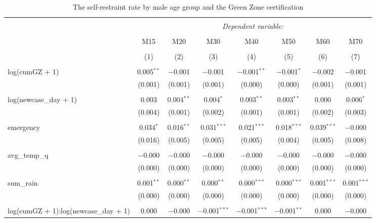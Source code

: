 
\begin{table}[!htbp] \centering 
  \caption{The self-restraint rate by male age group and the Green Zone certification} 
  \label{} 
\begin{tabular}{@{\extracolsep{5pt}}lccccccc} 
\\[-1.8ex]\hline 
\hline \\[-1.8ex] 
 & \multicolumn{7}{c}{\textit{Dependent variable:}} \\ 
\cline{2-8} 
\\[-1.8ex] & M15 & M20 & M30 & M40 & M50 & M60 & M70 \\ 
\\[-1.8ex] & (1) & (2) & (3) & (4) & (5) & (6) & (7)\\ 
\hline \\[-1.8ex] 
 log(cumGZ + 1) & 0.005$^{**}$ & $-$0.001 & $-$0.001 & $-$0.001$^{**}$ & $-$0.001$^{*}$ & $-$0.002 & $-$0.001 \\ 
  & (0.001) & (0.001) & (0.001) & (0.000) & (0.000) & (0.001) & (0.001) \\ 
  & & & & & & & \\ 
 log(newcase\_day + 1) & 0.003 & 0.004$^{**}$ & 0.004$^{*}$ & 0.003$^{**}$ & 0.003$^{**}$ & 0.000 & 0.006$^{*}$ \\ 
  & (0.004) & (0.001) & (0.002) & (0.001) & (0.001) & (0.002) & (0.003) \\ 
  & & & & & & & \\ 
 emergency & 0.034$^{*}$ & 0.016$^{**}$ & 0.031$^{***}$ & 0.021$^{***}$ & 0.018$^{***}$ & 0.039$^{***}$ & $-$0.000 \\ 
  & (0.016) & (0.005) & (0.005) & (0.005) & (0.004) & (0.005) & (0.008) \\ 
  & & & & & & & \\ 
 avg\_temp\_q & $-$0.000 & $-$0.000 & $-$0.000 & $-$0.000 & $-$0.000 & $-$0.000 & $-$0.000 \\ 
  & (0.000) & (0.000) & (0.000) & (0.000) & (0.000) & (0.000) & (0.000) \\ 
  & & & & & & & \\ 
 sum\_rain & 0.001$^{**}$ & 0.000$^{**}$ & 0.000$^{**}$ & 0.000$^{***}$ & 0.000$^{***}$ & 0.001$^{***}$ & 0.001$^{***}$ \\ 
  & (0.000) & (0.000) & (0.000) & (0.000) & (0.000) & (0.000) & (0.000) \\ 
  & & & & & & & \\ 
 log(cumGZ + 1):log(newcase\_day + 1) & 0.000 & $-$0.000 & $-$0.001$^{***}$ & $-$0.001$^{***}$ & $-$0.001$^{**}$ & 0.000 & $-$0.000 \\ 

\end{tabular}
\end{table}
